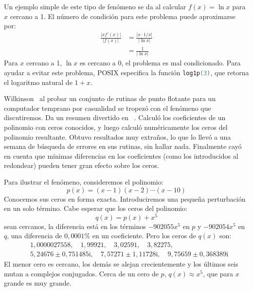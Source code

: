   Un ejemplo simple de este tipo de fenómeno se da
  al calcular \(f(x) = \ln x\)
  para \(x\) cercano a \num{1}.
  El número de condición para este problema puede aproximarse por:
  \begin{align*}
    \frac{\lvert x f'(x) \rvert}{\lvert f(x) \rvert}
      &=  \frac{\lvert x \cdot 1 / x \rvert}{\lvert \ln x \rvert} \\
      &=  \frac{1}{\lvert \ln x \rvert}
  \end{align*}
  Para \(x\) cercano a \num{1},
  \(\ln x\) es cercano a \num{0},
  el problema es mal condicionado.
  Para ayudar a evitar este problema,
  POSIX especifica la función \lstinline[language = C]!log1p(3)!,
  que retorna el logaritmo natural de \(1 + x\).

  Wilkinson~%
    \cite{wilkinson59:_ill_conditioned-_poly-I,
          wilkinson59:_ill_conditioned-_poly-II}
  al probar un conjunto de rutinas de punto flotante
  para un computador temprano
  por casualidad se tropezó con el fenómeno que discutiremos.
  Da un resumen divertido en~%
    \cite{wilkinson84:_perfidious_polynomial}.
  Calculó los coeficientes de un polinomio con ceros conocidos,
  y luego calculó numéricamente los ceros del polinomio resultante.
  Obtuvo resultados muy extraños,
  lo que lo llevó a una semana de búsqueda de errores en sus rutinas,
  sin hallar nada.
  Finalmente cayó en cuenta que mínimas diferencias en los coeficientes
  (como los introducidos al redondear)
  pueden tener gran efecto sobre los ceros.

  Para ilustrar el fenómeno,
  consideremos el polinomio:
  \begin{equation*}
    p(x)
      = (x - 1) (x - 2) \dotsm (x - 10)
  \end{equation*}
  Conocemos sus ceros en forma exacta.
  Introduciremos una pequeña perturbación en un solo término.
  Cabe esperar que los ceros del polinomio:
  \begin{equation*}
    q(x)
      = p(x) + x^5
  \end{equation*}
  sean cercanos,
  la diferencia está en los términos
  \(- 902055 x^5\) en \(p\)
  y \(- 902054 x^5\) en \(q\),
  una diferencia de \(0,0001\%\) en un coeficiente.
  Pero los ceros de \(q(x)\) son:
  \begin{align*}
    &1,0000027558, \quad 1,99921, \quad 3,02591, \quad 3,82275, \\
    &5,24676 \pm 0,751485 \mathrm{i}, \quad
       7,57271 \pm 1,11728 \mathrm{i}, \quad
       9,75659 \pm 0,368389 \mathrm{i}
  \end{align*}
  El menor cero es cercano,
  los demás se alejan crecientemente
  y los últimos seis mutan a complejos conjugados.
  Cerca de un cero de \(p\),
  \(q(x) \approx x^5\),
  que para \(x\) grande es muy grande.

